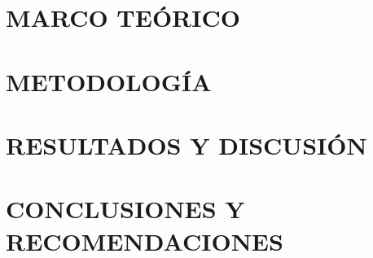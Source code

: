 \documentclass{tesis}
\begin{document}



\setcounter{page}{2}











\newpage
\renewcommand{\thepage}{\arabic{page}}%
\setcounter{page}{1}
\chapter{MARCO TEÓRICO}\label{ch:marco-teorico}








\chapter{METODOLOGÍA}\label{ch:metodologia}



\chapter{RESULTADOS Y DISCUSIÓN}\label{ch:resultados-y-discusion}






\chapter{CONCLUSIONES Y RECOMENDACIONES}\label{ch:conclusiones-y-recomendaciones}



\end{document}
